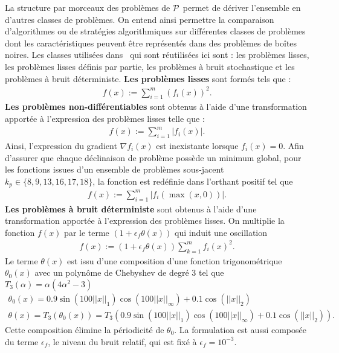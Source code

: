 La structure par morceaux des problèmes de $\mathcal{P}$ permet de dériver l'ensemble en d'autres classes de problèmes. On entend ainsi permettre la comparaison d'algorithmes ou de stratégies algorithmiques sur différentes classes de problèmes dont les caractéristiques peuvent être représentés dans des problèmes de boîtes noires. Les classes utilisées dans~\cite{MoWi2009} qui sont réutilisées ici sont : les problèmes lisses, les problèmes lisses définis par partie, les problèmes à bruit stochastique et les problèmes à bruit déterministe.  \textbf{Les problèmes lisses} sont formés tels que : 
\begin{gather*}
f(x):=\sum_{i=1}^{m}{\left(f_i(x)\right)}^2.
\end{gather*}
\textbf{Les problèmes non-différentiables} sont obtenus à l'aide d'une transformation apportée à l'expression des problèmes lisses telle que : 
\begin{gather*}
f(x):=\sum_{i=1}^{m}{|f_i(x)|}.
\end{gather*}
Ainsi, l'expression du gradient $\nabla f_i(x)$ est inexistante lorsque $f_i(x)=0$. Afin d'assurer que chaque déclinaison de problème possède un minimum global, pour les fonctions issues d'un ensemble de problèmes sous-jacent $k_p \in\{ 8,9,13,16,17,18\}$, la fonction est redéfinie dans l'orthant positif tel que
\begin{gather*}
f(x):=\sum_{i=1}^{m}{|f_i(\max(x,0))|}.
\end{gather*}
\textbf{Les problèmes à bruit déterministe} sont obtenus à l'aide d'une transformation apportée à l'expression des problèmes lisses. On multiplie la fonction $f(x)$ par le terme $(1+\epsilon_{f}\theta(x))$ qui induit une oscillation 
\begin{gather*}
f(x):=(1+\epsilon_{f}\theta(x))\sum_{k=1}^{m}{f_{i}(x)^{2}}.
\end{gather*}
Le terme $\theta(x)$ est issu d'une composition d'une fonction trigonométrique $\theta_0(x)$ avec un polynôme de Chebyshev de degré 3 tel que $T_{3}(\alpha) = \alpha(4\alpha^{2}-3)$
\begin{gather*}
\theta_0(x)=0.9\sin(100||x||_{1})\cos(100||x||_\infty)+0.1\cos(||x||_2) \\
\theta(x) = T_3(\theta_0(x)) = T_{3}(0.9\sin(100||x||_{1})\cos(100||x||_\infty)+0.1\cos(||x||_2)).
\end{gather*} 
Cette composition élimine la périodicité de $\theta_{0}$. La formulation est aussi composée du terme $\epsilon_f$, le niveau du bruit relatif, qui est fixé à $\epsilon_f = 10^{-3}$.  

